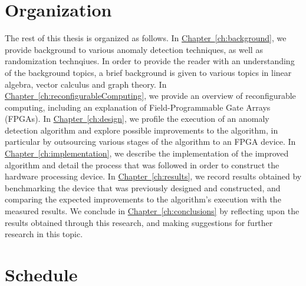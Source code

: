 \section{Organization}
\label{sec:organization}
The rest of this thesis is organized as follows. In \hyperref[ch:background]
{Chapter~\ref{ch:background}}, we provide background to various anomaly 
detection techniques, as well as randomization technqiues. In order to provide 
the reader with an understanding of the background topics, a brief background is
given to various topics in linear algebra, vector calculus and graph theory. In
\hyperref[ch:reconfigurableComputing]{Chapter~\ref{ch:reconfigurableComputing}}, 
we provide an overview of reconfigurable computing, including an explanation of 
Field-Programmable Gate Arrays (FPGAs). In \hyperref[ch:design]
{Chapter~\ref{ch:design}}, we profile the execution of an anomaly detection 
algorithm and explore possible improvements to the algorithm, in particular by 
outsourcing various stages of the algorithm to an FPGA device. In 
\hyperref[ch:implementation]{Chapter~\ref{ch:implementation}}, we describe the 
implementation of the improved algorithm and detail the process that was 
followed in order to construct the hardware processing device. In 
\hyperref[ch:results]{Chapter~\ref{ch:results}}, we record results obtained by 
benchmarking the device that was previously designed and constructed, and 
comparing the expected improvements to the algorithm's execution with the 
measured results. We conclude in \hyperref[ch:conclusions]
{Chapter~\ref{ch:conclusions}} by reflecting upon the results obtained through 
this research, and making suggestions for further research in this topic.
 
\section{Schedule}
\label{sec:schedule}

